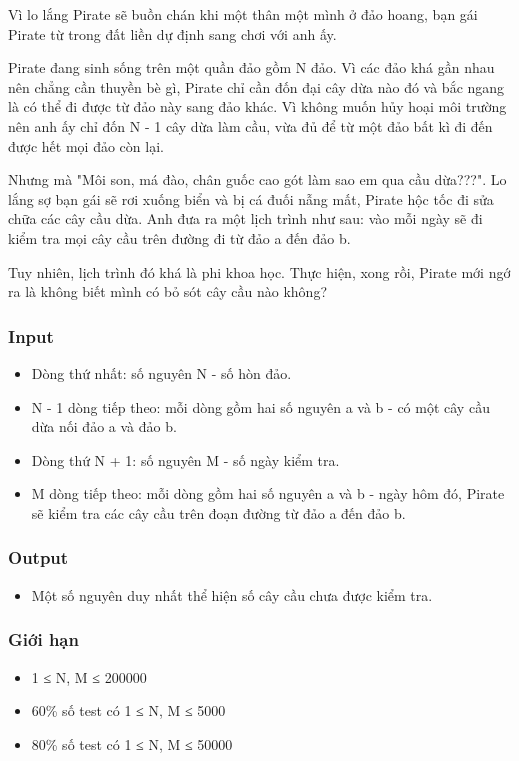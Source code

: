 



   Vì lo lắng Pirate sẽ buồn chán khi một thân một mình ở đảo hoang, bạn gái Pirate từ trong đất liền dự định sang chơi với anh ấy.  

   Pirate đang sinh sống trên một quần đảo gồm N đảo. Vì các đảo khá gần nhau nên chẳng cần thuyền bè gì, Pirate chỉ cần đốn đại cây dừa nào đó và bắc ngang là có thể đi được từ đảo này sang đảo khác. Vì không muốn hủy hoại môi trường nên anh ấy chỉ đốn N - 1 cây dừa làm cầu, vừa đủ để từ một đảo bất kì đi đến được hết mọi đảo còn lại.  

   Nhưng mà "Môi son, má đào, chân guốc cao gót làm sao em qua cầu dừa???". Lo lắng sợ bạn gái sẽ rơi xuống biển và bị cá đuối nẫng mất, Pirate hộc tốc đi sửa chữa các cây cầu dừa. Anh đưa ra một lịch trình như sau: vào mỗi ngày sẽ đi kiểm tra mọi cây cầu trên đường đi từ đảo a đến đảo b.  

   Tuy nhiên, lịch trình đó khá là phi khoa học. Thực hiện, xong rồi, Pirate mới ngớ ra là không biết mình có bỏ sót cây cầu nào không?  

\subsubsection{   Input  }
\begin{itemize}
	\item     Dòng thứ nhất: số nguyên N - số hòn đảo.   
	\item     N - 1 dòng tiếp theo: mỗi dòng gồm hai số nguyên a và b - có một cây cầu dừa nối đảo a và đảo b.   
	\item     Dòng thứ N + 1: số nguyên M - số ngày kiểm tra.   
	\item     M dòng tiếp theo: mỗi dòng gồm hai số nguyên a và b - ngày hôm đó, Pirate sẽ kiểm tra các cây cầu trên đoạn đường từ đảo a đến đảo b.   
\end{itemize}

\subsubsection{   Output  }
\begin{itemize}
	\item     Một số nguyên duy nhất thể hiện số cây cầu chưa được kiểm tra.   
\end{itemize}

\subsubsection{   Giới hạn  }
\begin{itemize}
	\item     1 ≤ N, M ≤ 200000   
	\item     60\% số test có 1 ≤ N, M ≤ 5000   
	\item     80\% số test có 1 ≤ N, M ≤ 50000   
\end{itemize}


